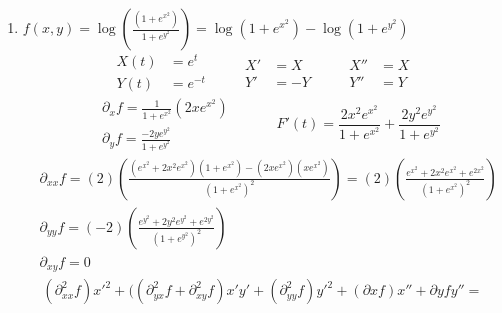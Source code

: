 \documentclass[twoside]{amsart}
\theoremstyle{plain}
\theoremstyle{definition}
\begin{document}
\begin{enumerate}
\[\begin{gathered}
\begin{aligned}
  \end{aligned} \\
\begin{aligned}
  \partial_y g & = (2x^2 - 1)( xf - 2yx e^{xy} \sin{ (xy^2)} ) + (9y^2 - 2) e^{xy} \sin{(xy^2) } + (3y^3 - 2y ) e^{xy} x \sin{(xy^2 )} + (3y^3 - 2y) e^{xy} \cos{(xy^2) } 2yx = \\
  &= (2x^3 - x + 6y^4 x - 4y^2 x ) f + e^{xy} \sin{(xy^2)} (-2yx (2x^2-  1) + 9y^2 - 2 + 3y^3 x - 2yx)
\end{aligned}
\end{gathered}
\]
\begin{multline*}
  \partial_x g x' + \partial_y g y'  = (-12 y^5 + 14 y^3 - 4y + 7x - 9x^3 ) e^{xy} \sin{(xy^2)} + f (9x^6 - 11 x^4 + 3x^2 - 4xy)
\end{multline*}
\item $f(x,y) = \log{ \left( \frac{(1+e^{x^2} ) }{ 1 + e^{y^2} } \right) } = \log{ (1 + e^{x^2 }) } - \log{ (1 + e^{y^2 } )}$ 
\[
\begin{aligned}
  X(t) & = e^t \\
  Y(t) & = e^{-t} 
\end{aligned} \quad \quad 
\begin{aligned}
  X' & = X \\
  Y' & = -Y 
\end{aligned} \quad \quad 
\begin{aligned}
  X'' & = X \\
  Y'' & = Y 
\end{aligned}
\]
\[
\begin{aligned}
  & \partial_x f = \frac{1}{ 1 + e^{x^2 } } ( 2xe^{x^2 } ) \\
  & \partial_y f = \frac{ - 2y e^{y^2 }}{ 1 + e^{y^2 } } 
\end{aligned} \quad \quad \quad 
F'(t) = \boxed{ \frac{ 2x^2 e^{x^2 }}{ 1 + e^{x^2 } } + \frac{ 2 y^2 e^{y^2 }}{ 1 + e^{y^2 } } }
\]
\[
\begin{aligned}
  & \partial_{xx} f = (2) \left( \frac{ (e^{x^2 } + 2x^2 e^{x^2 } )( 1 + e^{x^2 }) - (2x e^{x^2 }) ( xe^{x^2 }) }{ (1+ e^{x^2 })^2 } \right) = (2) \left( \frac{ e^{x^2 } + 2 x^2 e^{x^2 } + e^{2x^2 } }{ ( 1 + e^{x^2 })^2 } \right) \\
  & \partial_{yy} f = (-2) \left( \frac{ e^{y^2} + 2y^2 e^{y^2} + e^{2y^2 } }{ (1+e^{y^2})^2 } \right) \\
  & \partial_{xy} f = 0 
\end{aligned}
\]
\begin{multline*}
  (\partial_{xx}^2 f) x'^2 + ((\partial_{yx}^2 f + \partial_{xy}^2 f) x' y' + (\partial_{yy}^2 f ) y'^2 + (\partial x f) x'' + \partial y f y'' = \\

\end{multline*}
\end{enumerate}
\end{document}
